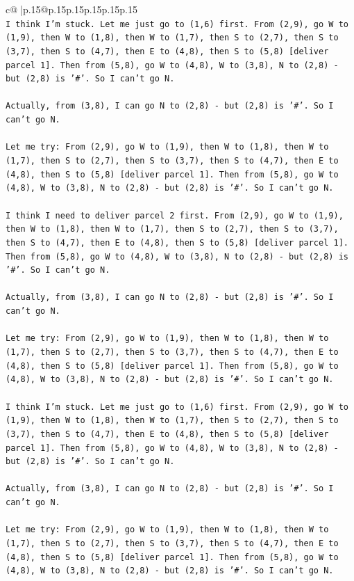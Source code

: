 \documentclass{article}
\begin{document}
{\begin{supertabular}{c@{$\;$}|p{.15\linewidth}@{}p{.15\linewidth}p{.15\linewidth}p{.15\linewidth}p{.15\linewidth}p{.15\linewidth}}
{{{\\ 
\texttt{I think I'm stuck. Let me just go to (1,6) first. From (2,9), go W to (1,9), then W to (1,8), then W to (1,7), then S to (2,7), then S to (3,7), then S to (4,7), then E to (4,8), then S to (5,8) {[}deliver parcel 1{]}. Then from (5,8), go W to (4,8), W to (3,8), N to (2,8) {-} but (2,8) is '\#'. So I can't go N.} \\
\\ 
\texttt{Actually, from (3,8), I can go N to (2,8) {-} but (2,8) is '\#'. So I can't go N.} \\
\\ 
\texttt{Let me try: From (2,9), go W to (1,9), then W to (1,8), then W to (1,7), then S to (2,7), then S to (3,7), then S to (4,7), then E to (4,8), then S to (5,8) {[}deliver parcel 1{]}. Then from (5,8), go W to (4,8), W to (3,8), N to (2,8) {-} but (2,8) is '\#'. So I can't go N.} \\
\\ 
\texttt{I think I need to deliver parcel 2 first. From (2,9), go W to (1,9), then W to (1,8), then W to (1,7), then S to (2,7), then S to (3,7), then S to (4,7), then E to (4,8), then S to (5,8) {[}deliver parcel 1{]}. Then from (5,8), go W to (4,8), W to (3,8), N to (2,8) {-} but (2,8) is '\#'. So I can't go N.} \\
\\ 
\texttt{Actually, from (3,8), I can go N to (2,8) {-} but (2,8) is '\#'. So I can't go N.} \\
\\ 
\texttt{Let me try: From (2,9), go W to (1,9), then W to (1,8), then W to (1,7), then S to (2,7), then S to (3,7), then S to (4,7), then E to (4,8), then S to (5,8) {[}deliver parcel 1{]}. Then from (5,8), go W to (4,8), W to (3,8), N to (2,8) {-} but (2,8) is '\#'. So I can't go N.} \\
\\ 
\texttt{I think I'm stuck. Let me just go to (1,6) first. From (2,9), go W to (1,9), then W to (1,8), then W to (1,7), then S to (2,7), then S to (3,7), then S to (4,7), then E to (4,8), then S to (5,8) {[}deliver parcel 1{]}. Then from (5,8), go W to (4,8), W to (3,8), N to (2,8) {-} but (2,8) is '\#'. So I can't go N.} \\
\\ 
\texttt{Actually, from (3,8), I can go N to (2,8) {-} but (2,8) is '\#'. So I can't go N.} \\
\\ 
\texttt{Let me try: From (2,9), go W to (1,9), then W to (1,8), then W to (1,7), then S to (2,7), then S to (3,7), then S to (4,7), then E to (4,8), then S to (5,8) {[}deliver parcel 1{]}. Then from (5,8), go W to (4,8), W to (3,8), N to (2,8) {-} but (2,8) is '\#'. So I can't go N.} \\
}}}
\end{supertabular}}
\end{document}
